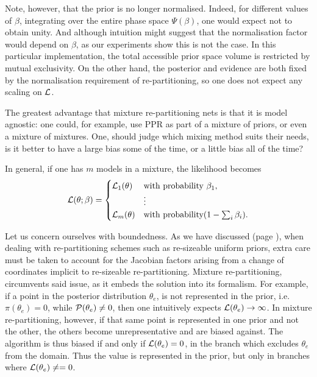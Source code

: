 \documentclass[usenatbib]{mnras}
\begin{document}
Note, however, that the prior is no longer normalised. Indeed, for
different values of \(\beta\), integrating over the entire phase
space \(\Psi(\beta)\), one would expect not to obtain unity. And
although intuition might suggest that the normalisation factor
would depend on \(\beta\), as our experiments show this is not the
case. In this particular implementation, the total accessible
prior space volume is restricted by mutual exclusivity. On the
other hand, the posterior and evidence are both fixed by the
normalisation requirement of re-partitioning, so one does not
expect any scaling on \({\cal L}\). 

The greatest advantage that mixture re-partitioning nets is
that it is model agnostic: one could, for example, use PPR as
part of a mixture of priors, or even a mixture of
mixtures. One, should judge which mixing method suits their
needs, is it better to have a large bias some of the time, or
a little bias all of the time?

In general,  if one has \(m\) models in a mixture, the likelihood becomes 
\begin{equation}
  {\cal L}(\theta; \beta)  = \begin{cases}
	{\cal L}_{1}(\theta) &  \text{with probability } \beta_{1},\\
		    &\vdots\\
	{\cal L}_{m}(\theta) & \text{with probability} (1- \sum_{i}\beta_{i}).
	\end{cases}
\end{equation}


Let us concern ourselves with boundedness. As we have discussed
(page \pageref{domain-discussion}), when dealing with
re-partitioning schemes such as re-sizeable uniform priors, extra
care must be taken to account for the Jacobian factors arising
from a change of coordinates implicit to re-sizeable
re-partitioning. Mixture re-partitioning, circumvents said issue,
as it embeds the solution into its formalism. For example, if a
point in the posterior distribution \(\theta_{e}\), is not
represented in the prior, i.e.  \(\pi(\theta_{e}) = 0\), while
\({\cal P}(\theta_{e}) \ne 0\), then one intuitively expects \({\cal
	L}(\theta_{e}) \rightarrow \infty\). In mixture re-partitioning,
however, if that same point is represented in one prior and not
the other, the others become unrepresentative and are biased
against. The algorithm is thus biased if and only if \({\cal
	L}(\theta_{e}) = 0\), in the branch which excludes \(\theta_{e}\)
from the domain. Thus the value is represented in the prior, but
only in branches where  \({\cal L}(\theta_{e}) \ne=0\).
\end{document}

